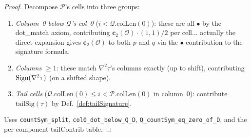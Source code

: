 \begin{proof}
  \leanok
  Decompose $\mathcal{P}$'s cells into three groups:
  \begin{enumerate}
    \item \emph{Column~0 below $\mathcal{Q}$'s col~0} ($i < \mathcal{Q}.\mathrm{colLen}(0)$): these are all $\bullet$ by the dot\_match axiom, contributing $\mathbf{c}_2(\mathcal{O}) \cdot (1, 1) / 2$ per cell... actually the direct expansion gives $\mathbf{c}_2(\mathcal{O})$ to both $p$ and $q$ via the $\bullet$ contribution to the signature formula.
    \item \emph{Columns $\geq 1$}: these match $\nabla^2\tau$'s columns exactly (up to shift), contributing $\mathrm{Sign}(\nabla^2\tau)$ (on a shifted shape).
    \item \emph{Tail cells} ($\mathcal{Q}.\mathrm{colLen}(0) \leq i < \mathcal{P}.\mathrm{colLen}(0)$ in column~0): contribute $\mathrm{tailSig}(\tau)$ by Def.~\ref{def:tailSignature}.
  \end{enumerate}
  Uses \texttt{countSym\_split}, \texttt{col0\_dot\_below\_Q\_D}, \texttt{Q\_countSym\_eq\_zero\_of\_D}, and the per-component $\mathrm{tailContrib}$ table.
\end{proof}
